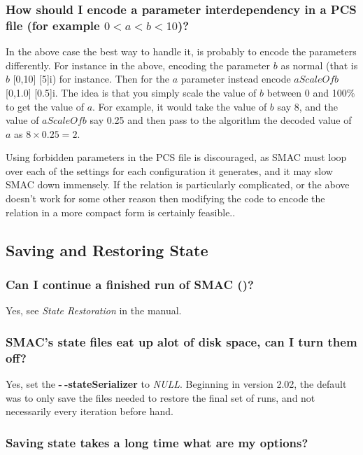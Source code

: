 \documentclass[11pt,letterpaper,oneside]{article}
\begin{document}
\subsubsection{How should I encode a parameter interdependency in a PCS file (for example $0 < a < b < 10$)?}

	In the above case the best way to handle it, is probably to encode the parameters differently. For instance in the above, encoding the parameter $b$ as normal (that is $b$ [0,10] [5]i) for instance. Then for the $a$ parameter instead encode $aScaleOfb$ [0,1.0] [0.5]i.  The idea is that you simply scale the value of $b$ between 0 and 100\% to get the value of $a$. For example, it would take the value of $b$ say 8, and the value of $aScaleOfb$ say 0.25 and then pass to the algorithm the decoded value of $a$ as $8\times0.25=2$.

	Using forbidden parameters in the PCS file is discouraged, as SMAC must loop over each of the settings for each configuration it generates, and it may slow SMAC down immensely. If the relation is particularly complicated, or the above doesn't work for some other reason then modifying the code to encode the relation in a more compact form is certainly feasible..

\subsection{Saving and Restoring State}

\subsubsection{Can I continue a finished run of SMAC ()?}

	Yes, see \emph{State Restoration} in the manual.

\subsubsection{SMAC's state files eat up alot of disk space, can I turn them off?}

	Yes, set the \textbf{-$~\!$-stateSerializer} to \emph{NULL}. Beginning in version 2.02, the default was to only save the files needed to restore the final set of runs, and not necessarily every iteration before hand.
	
\subsubsection{Saving state takes a long time what are my options?}
\end{document}
